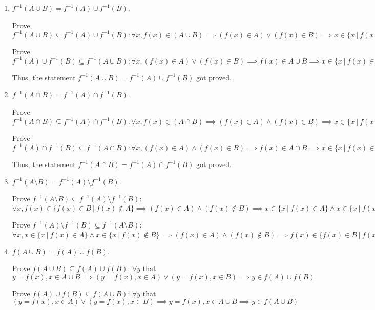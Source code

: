 \documentclass{article}\usepackage{amsmath,amssymb,amsthm,tikz,tkz-graph,color,chngpage,soul,hyperref,csquotes,graphicx,floatrow, yfonts}\newcommand*{\QEDB}{\hfill\ensuremath{\square}}\newtheorem*{prop}{Proposition}\renewcommand{\theenumi}{\alph{enumi}}\usepackage[shortlabels]{enumitem}\usepackage[nobreak=true, framemethod=tikz]{mdframed}\usetikzlibrary{matrix,calc, automata, positioning}\MakeOuterQuote{"}\usepackage[margin=1in]{geometry} \newtheorem{theorem}{Theorem}
\begin{document}
\begin{enumerate}
    \item $f^{-1}(A \cup B) = f^{-1}(A) \cup f^{-1}(B)$.
    \begin{mdframed}
 Prove $ f^{-1}(A \cup B) \subseteq f^{-1}(A) \cup f^{-1}(B): \forall x, f(x) \in (A \cup B) \implies (f(x) \in A) \lor (f(x) \in B) \implies x \in \{x~|~f(x) \in A\} \cup \{x~|~f(x) \in B\}$ \par
 Prove $ f^{-1}(A) \cup f^{-1}(B) \subseteq f^{-1}(A \cup B): \forall x, (f(x) \in A) \lor (f(x) \in B) \implies f(x) \in A \cup B \implies x \in \{x~|~f(x) \in A \cup B\}$ \par
 Thus, the statement $f^{-1}(A \cup B) = f^{-1}(A) \cup f^{-1}(B)$ got proved.
    \end{mdframed}

    \item $f^{-1}(A \cap B) = f^{-1}(A) \cap f^{-1}(B)$.
    \begin{mdframed}
  Prove $ f^{-1}(A \cap B) \subseteq f^{-1}(A) \cap f^{-1}(B): \forall x, f(x) \in (A \cap B) \implies (f(x) \in A) \land (f(x) \in B) \implies x \in \{x~|~f(x) \in A\} \cap \{x~|~f(x) \in B\}$ \par
  Prove $ f^{-1}(A) \cap f^{-1}(B) \subseteq f^{-1}(A \cap B): \forall x, (f(x) \in A) \land (f(x) \in B) \implies f(x) \in A \cap B \implies x \in \{x~|~f(x) \in A \cap B\}$ \par
  Thus, the statement $f^{-1}(A \cap B) = f^{-1}(A) \cap f^{-1}(B)$ got proved.
    \end{mdframed}
    
    \item $f^{-1}(A \setminus B) = f^{-1}(A) \setminus f^{-1}(B)$.
    \begin{mdframed}
    Prove $f^{-1}(A \setminus B) \subseteq f^{-1}(A) \setminus f^{-1}(B)$: $ \forall x, f(x) \in \{ f(x) \in B \ | \ f(x) \notin A \} \implies (f(x) \in A) \land (f(x) \notin B) \implies x \in \{ x~|~f(x) \in A \} \land x \in \{ x~|~f(x) \notin B \}  \implies x \in f^{-1}(A) \setminus f^{-1}(B)$ \par
    Prove $f^{-1}(A) \setminus f^{-1}(B) \subseteq f^{-1}(A \setminus B)$: $ \forall x,  x \in \{ x~|~f(x) \in A \} \land x \in \{ x~|~f(x) \notin B \} \implies (f(x) \in A) \land (f(x) \notin B) \implies f(x) \in \{ f(x) \in B \ | \ f(x) \notin A \} \implies x \in f^{-1}(A \setminus B)$ 
    \end{mdframed}
    
    \item $f(A \cup B) = f(A) \cup f(B)$.
    \begin{mdframed}
     Prove $f(A \cup B) \subseteq f(A) \cup f(B)$: $ \forall y $ that $ y = f(x), x \in A \cup B \implies (y = f(x), x \in A) \lor (y = f(x), x \in B) \implies y \in f(A) \cup f(B)$ \par
     Prove $f(A) \cup f(B) \subseteq f(A \cup B)$: $ \forall y $ that $ (y = f(x), x \in A) \lor (y = f(x), x \in B) \implies y = f(x), x \in A \cup B \implies  y \in f(A \cup B)$
    \end{mdframed}
    

\end{enumerate}
\end{document}

